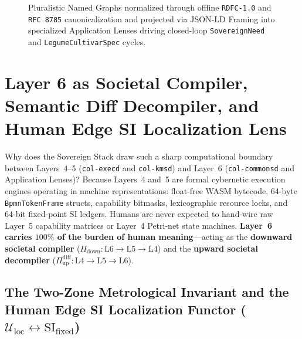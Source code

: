 \begin{figure}[htbp]
{%
}
\caption{Pluralistic Named Graphs normalized through offline \texttt{RDFC-1.0} and \texttt{RFC 8785} canonicalization and projected via JSON-LD Framing into specialized Application Lenses driving closed-loop \texttt{SovereignNeed} and \texttt{LegumeCultivarSpec} cycles.}
\label{fig:ch2-semantic-foundation}
\end{figure}

\section{Layer 6 as Societal Compiler, Semantic Diff Decompiler, and Human Edge SI Localization Lens}
\label{sec:societal-compiler-si-localization}

Why does the Sovereign Stack draw such a sharp computational boundary between Layers~4--5 (\texttt{col-execd} and \texttt{col-kmsd}) and Layer~6 (\texttt{col-commonsd} and Application Lenses)? Because Layers~4 and~5 are formal cybernetic execution engines operating in machine representations: float-free WASM bytecode, 64-byte \texttt{BpmnTokenFrame} structs, capability bitmasks, lexicographic resource locks, and 64-bit fixed-point SI ledgers. Humans are never expected to hand-wire raw Layer~5 capability matrices or Layer~4 Petri-net state machines. \textbf{Layer~6 carries $100\%$ of the burden of human meaning}---acting as the \textbf{downward societal compiler} ($\Pi_{\mathrm{down}} : \mathrm{L6} \to \mathrm{L5} \to \mathrm{L4}$) and the \textbf{upward societal decompiler} ($\Pi_{\mathrm{up}}^{\mathrm{diff}} : \mathrm{L4} \to \mathrm{L5} \to \mathrm{L6}$).

\subsection{The Two-Zone Metrological Invariant and the Human Edge SI Localization Functor ($\mathcal{U}_{\mathrm{loc}} \leftrightarrow \mathrm{SI}_{\mathrm{fixed}}$)}
\label{subsec:si-localization-functor}

